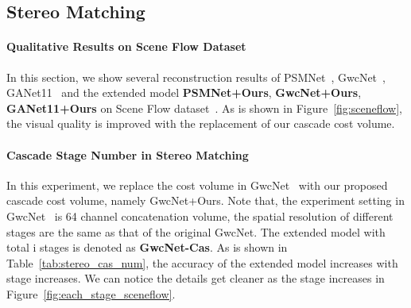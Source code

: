 \documentclass[10pt,twocolumn,letterpaper]{article}
\begin{document}
\subsection{Stereo Matching}
\paragraph{Qualitative Results on Scene Flow Dataset}
In this section, we show several reconstruction results of PSMNet~\cite{chang2018pyramid}, GwcNet~\cite{guo2019group}, GANet11~\cite{zhang2019ga}  and the extended model \textbf{PSMNet+Ours}, \textbf{GwcNet+Ours}, \textbf{GANet11+Ours} on Scene Flow dataset~\cite{mayer2016large}.  As is shown in Figure~\ref{fig:sceneflow}, the visual quality is improved with the replacement of our cascade cost volume.

\vspace{-2mm}
\paragraph{Cascade Stage Number in Stereo Matching}
In this experiment, we replace the cost volume in GwcNet~\cite{guo2019group} with our proposed cascade cost volume, namely GwcNet+Ours. Note that, the experiment setting in GwcNet~\cite{guo2019group} is 64 channel concatenation volume, the spatial resolution of different stages are the same as that of the original GwcNet. The extended model with total i stages is denoted as \textbf{GwcNet-Cas}. As is shown in Table~\ref{tab:stereo_cas_num}, the accuracy of the extended model increases with stage increases. We can notice the details get cleaner as the stage increases in Figure~\ref{fig:each_stage_sceneflow}.


\begin{table}[t!]
\begin{center}
\footnotesize
{}
\end{center} 
\vspace{-4mm}
\caption{Comparisons between GwcNet~\cite{guo2019group} and GwcNet using our cascade cost volume with different setting of the numbers of hypothesis planes and depth intervals. The statistics are collected on the test set of Scene Flow dataset~\cite{mayer2016large}}
\label{tab:stereo_cas_num}
\vspace{-4mm}
\end{table}
\end{document}
